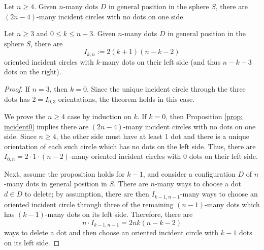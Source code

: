\documentclass[10pt,a4paper]{amsart}
\begin{document}
\begin{prop}\label{prop: incident0}
Let $n\geq4$. Given $n$-many dots $D$ in general position in the sphere $S$, there are $(2n-4)$-many incident circles with no dots on one side.
\end{prop}

\begin{prop}\label{prop: orientedincident}
Let $n\geq3$ and $0\leq k \leq n-3$. Given $n$-many dots $D$ in general position in the sphere $S$, there are 
\[I_{k,n} := 2(k+1)(n-k-2)\]
oriented incident circles with $k$-many dots on their left side (and thus $n-k-3$ dots on the right).
\end{prop}

\begin{proof}
If $n=3$, then $k=0$. Since the unique incident circle through the three dots has $2=I_{0,3}$ orientations, the theorem holds in this case. %

We prove the $n\geq4$ case by induction on $k$. 
If $k=0$, then Proposition \ref{prop: incident0} implies there are $(2n-4)$-many incident circles with no dots on one side. Since $n\geq4$, the other side must have at least 1 dot and there is a unique orientation of each such circle which has no dots on the left side. Thus, there are $I_{0,n}=2\cdot 1\cdot(n-2)$-many oriented incident circles with $0$ dots on their left side.

Next, assume the proposition holds for $k-1$, and consider a configuration $D$ of $n$-many dots in general position in $S$. 
There are $n$-many ways to choose a dot $d\in D$ to delete; by assumption, there are then $I_{k-1,n-1}$-many ways to choose an oriented incident circle through three of the remaining $(n-1)$-many dots which has $(k-1)$-many dots on its left side. 
Therefore, there are
\[
n \cdot I_{k-1,n-1} = 2nk(n-k-2)
\]
ways to delete a dot and then choose an oriented incident circle with $k-1$ dots on its left side.


\end{proof}
\end{document}
